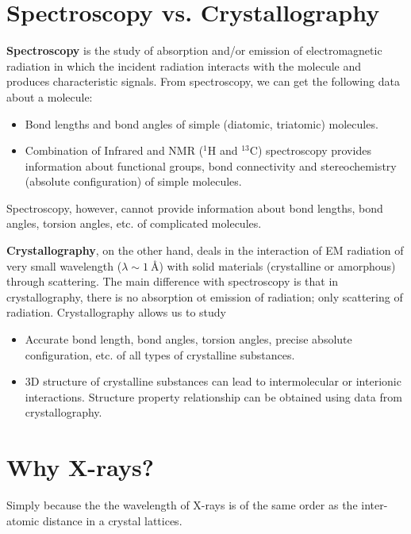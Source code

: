 \section{Spectroscopy vs. Crystallography}
	
\textbf{Spectroscopy} is the study of absorption and/or emission of electromagnetic radiation in which the incident radiation interacts with the molecule and produces characteristic signals. From spectroscopy, we can get the following data about a molecule:%
%			
\begin{itemize}%
%		
    \item Bond lengths and bond angles of simple (diatomic, triatomic) molecules.
    
    \item Combination of Infrared and NMR (${}^1 \mathrm{H}$ and ${}^{13} \mathrm{C}$) spectroscopy provides information about functional groups, bond connectivity and stereochemistry (absolute configuration) of simple molecules.
    
    \end{itemize}
    
Spectroscopy, however, cannot provide information about bond lengths, bond angles, torsion angles, etc. of complicated molecules.

\textbf{Crystallography}, on the other hand, deals in the interaction of EM radiation of very small wavelength ($\lambda \sim \SI{1}{\angstrom}$) with solid materials (crystalline or amorphous) through scattering. The main difference with spectroscopy is that in crystallography, there is no absorption ot emission of radiation; only scattering of radiation. Crystallography allows us to study%
%			
\begin{itemize}%
%			
    \item Accurate bond length, bond angles, torsion angles, precise absolute configuration, etc. of all types of crystalline substances.
    
    \item 3D structure of crystalline substances can lead to intermolecular or interionic interactions. Structure property relationship can be obtained using data from crystallography.
    
\end{itemize}

\section{Why X-rays?}

Simply because the the wavelength of X-rays is of the same order as the inter-atomic distance in a crystal lattices.
